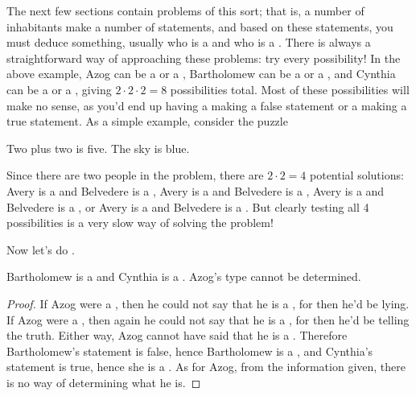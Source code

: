 \documentclass{tufte-book}
\begin{document}
\begin{center}
{\Large\Clocklogo}
\end{center}

The next few sections contain problems of this sort; that is, a number of inhabitants make a number of statements, and based on these statements, you must deduce something, usually who is a \knight and who is a \knave. There is always a straightforward way of approaching these problems: try every possibility! In the above example, Azog can be a \knight or a \knave, Bartholomew can be a \knight or a \knave, and Cynthia can be a \knight or a \knave, giving $2 \cdot 2 \cdot 2 = 8$ possibilities total. Most of these possibilities will make no sense, as you'd end up having a \knight making a false statement or a \knave making a true statement. As a simple example, consider the puzzle

\begin{dialogue}
   Two plus two is five.
   The sky is blue.
\end{dialogue}

Since there are two people in the problem, there are $2 \cdot 2 = 4$ potential solutions:   Avery is a \knight and Belvedere is a \knight, Avery is a \knight and Belvedere is a \knave, Avery is a \knave and Belvedere is a \knight, or Avery is a \knave and Belvedere is a \knave. But clearly testing all 4 possibilities is a very slow way of solving the problem! 

Now let's do .
\begin{claim}
  Bartholomew is a \knave and Cynthia is a \knight. Azog's type cannot be determined.
\end{claim}

\begin{proof}
  If Azog were a \knight, then he could not say that he is a \knave, for then he'd be lying. If Azog were a \knave, then again he could not say that he is a \knave, for then he'd be telling the truth. Either way, Azog cannot have said that he is a \knave. Therefore Bartholomew's statement is false,  hence Bartholomew is a \knave, and Cynthia's statement is true, hence she is a \knight. As for Azog, from the information given, there is no way of determining what he is.
\end{proof}
\end{document}
